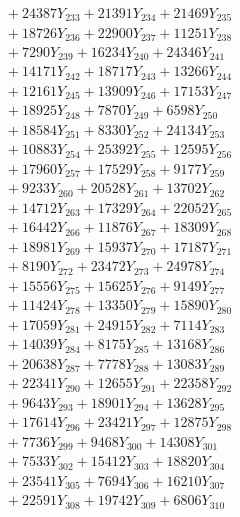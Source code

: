 \documentclass[a4paper,10pt]{article}
\begin{document}
{\begin{align}
&\;  + 24387 Y_{233} + 21391 Y_{234} + 21469 Y_{235} \\[0.3ex]
&\;  + 18726 Y_{236} + 22900 Y_{237} + 11251 Y_{238} \\[0.5ex]\allowbreak
&\;  + 7290 Y_{239} + 16234 Y_{240} + 24346 Y_{241} \\[0.3ex]
&\;  + 14171 Y_{242} + 18717 Y_{243} + 13266 Y_{244} \\[0.3ex]
&\;  + 12161 Y_{245} + 13909 Y_{246} + 17153 Y_{247} \\[0.3ex]
&\;  + 18925 Y_{248} + 7870 Y_{249} + 6598 Y_{250} \\[0.3ex]
&\;  + 18584 Y_{251} + 8330 Y_{252} + 24134 Y_{253} \\[0.3ex]
&\;  + 10883 Y_{254} + 25392 Y_{255} + 12595 Y_{256} \\[0.3ex]
&\;  + 17960 Y_{257} + 17529 Y_{258} + 9177 Y_{259} \\[0.3ex]
&\;  + 9233 Y_{260} + 20528 Y_{261} + 13702 Y_{262} \\[0.3ex]
&\;  + 14712 Y_{263} + 17329 Y_{264} + 22052 Y_{265} \\[0.3ex]
&\;  + 16442 Y_{266} + 11876 Y_{267} + 18309 Y_{268} \\[0.5ex]\allowbreak
&\;  + 18981 Y_{269} + 15937 Y_{270} + 17187 Y_{271} \\[0.3ex]
&\;  + 8190 Y_{272} + 23472 Y_{273} + 24978 Y_{274} \\[0.3ex]
&\;  + 15556 Y_{275} + 15625 Y_{276} + 9149 Y_{277} \\[0.3ex]
&\;  + 11424 Y_{278} + 13350 Y_{279} + 15890 Y_{280} \\[0.3ex]
&\;  + 17059 Y_{281} + 24915 Y_{282} + 7114 Y_{283} \\[0.3ex]
&\;  + 14039 Y_{284} + 8175 Y_{285} + 13168 Y_{286} \\[0.3ex]
&\;  + 20638 Y_{287} + 7778 Y_{288} + 13083 Y_{289} \\[0.3ex]
&\;  + 22341 Y_{290} + 12655 Y_{291} + 22358 Y_{292} \\[0.3ex]
&\;  + 9643 Y_{293} + 18901 Y_{294} + 13628 Y_{295} \\[0.3ex]
&\;  + 17614 Y_{296} + 23421 Y_{297} + 12875 Y_{298} \\[0.5ex]\allowbreak
&\;  + 7736 Y_{299} + 9468 Y_{300} + 14308 Y_{301} \\[0.3ex]
&\;  + 7533 Y_{302} + 15412 Y_{303} + 18820 Y_{304} \\[0.3ex]
&\;  + 23541 Y_{305} + 7694 Y_{306} + 16210 Y_{307} \\[0.3ex]
&\;  + 22591 Y_{308} + 19742 Y_{309} + 6806 Y_{310} \\[0.3ex]

\end{align}}
\end{document}
